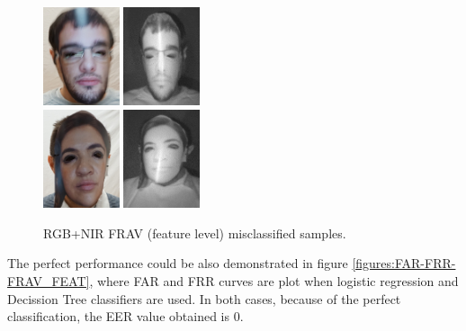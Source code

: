 \begin{figure}[htb]
\centering
\includegraphics[width=0.2\textwidth]{images_databases/frav_rgb_151.JPG}
\includegraphics[width=0.2\textwidth]{images_databases/frav_nir_151.jpg}
\\
\includegraphics[width=0.2\textwidth]{images_databases/frav_rgb_128.JPG}
\includegraphics[width=0.2\textwidth]{images_databases/frav_nir_128.jpg}
\caption{RGB+NIR FRAV (feature level) misclassified samples.} \label{fig:frav_feat_miscl}
\end{figure}

The perfect performance could be also demonstrated in figure \ref{figures:FAR-FRR-FRAV_FEAT}, where FAR and FRR curves are plot when logistic regression and Decission Tree classifiers are used. In both cases, because of the perfect classification, the EER value obtained is 0.\\

